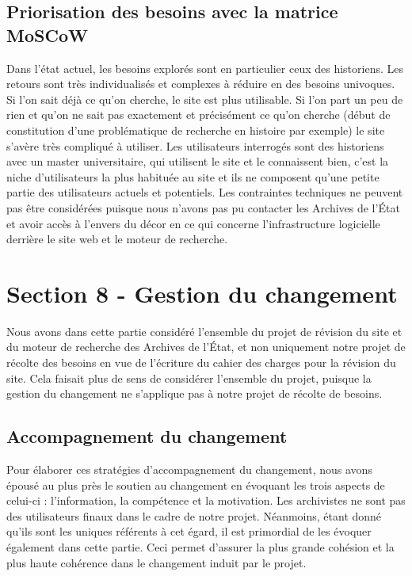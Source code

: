 \documentclass[a4paper,12pt]{article}
\begin{document}
\subsection{Priorisation des besoins avec la matrice MoSCoW}
Dans l’état actuel, les besoins explorés sont en particulier ceux des historiens. Les retours sont très individualisés et complexes à réduire en des besoins univoques. Si l’on sait déjà ce qu’on cherche, le site est plus utilisable. Si l’on part un peu de rien et qu’on ne sait pas exactement et précisément ce qu’on cherche (début de constitution d’une problématique de recherche en histoire par exemple) le site s'avère très compliqué à utiliser. Les utilisateurs interrogés sont des historiens avec un master universitaire, qui utilisent le site et le connaissent bien, c’est la niche d’utilisateurs la plus habituée au site et ils ne composent qu'une petite partie des utilisateurs actuels et potentiels.
Les contraintes techniques ne peuvent pas être considérées puisque nous n’avons pas pu contacter les Archives de l’État et avoir accès à l’envers du décor en ce qui concerne l’infrastructure logicielle derrière le site web et le moteur de recherche.

\section{Section 8 - Gestion du changement}
Nous avons dans cette partie considéré l'ensemble du projet de révision du site et du moteur de recherche des Archives de l'État, et non uniquement notre projet de récolte des besoins en vue de l'écriture du cahier des charges pour la révision du site. Cela faisait plus de sens de considérer l'ensemble du projet, puisque la gestion du changement ne s'applique pas à notre projet de récolte de besoins.

\subsection{Accompagnement du changement}
Pour élaborer ces stratégies d’accompagnement du changement, nous avons épousé au plus près le soutien au changement en évoquant les trois aspects de celui-ci : l'information, la compétence et la motivation.
Les archivistes ne sont pas des utilisateurs finaux dans le cadre de notre projet. Néanmoins, étant donné qu’ils sont les uniques référents à cet égard, il est primordial de les évoquer également dans cette partie. Ceci permet d’assurer la plus grande cohésion et la plus haute cohérence dans le changement induit par le projet.
\end{document}
